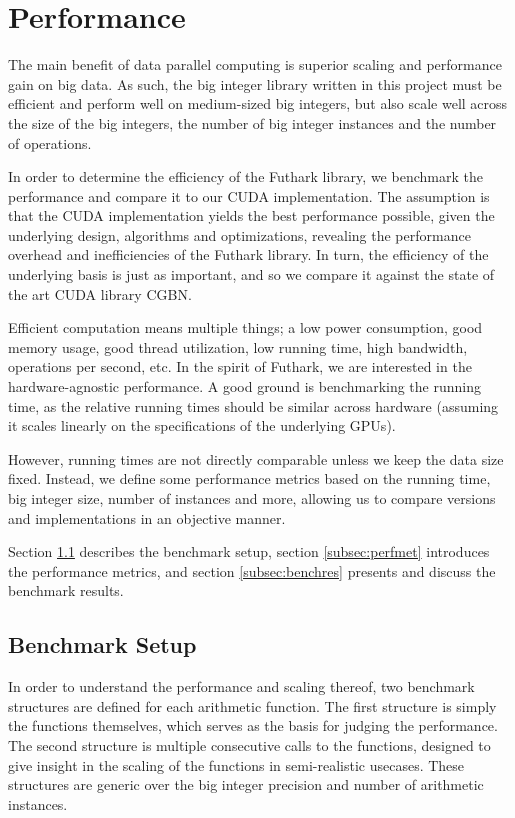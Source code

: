 \section{Performance}
\label{sec:per}

{}

The main benefit of data parallel computing is superior scaling and performance
gain on big data. As such, the big integer library written in this project must
be efficient and perform well on medium-sized big integers, but also scale well
across the size of the big integers, the number of big integer instances and the
number of operations.

In order to determine the efficiency of the Futhark library, we benchmark the
performance and compare it to our CUDA implementation. The assumption is that
the CUDA implementation yields the best performance possible, given the
underlying design, algorithms and optimizations, revealing the performance
overhead and inefficiencies of the Futhark library. In turn, the efficiency of
the underlying basis is just as important, and so we compare it against the
state of the art CUDA library CGBN.

Efficient computation means multiple things; a low power consumption, good
memory usage, good thread utilization, low running time, high bandwidth,
operations per second, etc. In the spirit of Futhark, we are interested in the
hardware-agnostic performance. A good ground is benchmarking the running time,
as the relative running times should be similar across hardware (assuming it
scales linearly on the specifications of the underlying GPUs).

However, running times are not directly comparable unless we keep the data size
fixed. Instead, we define some performance metrics based on the running time,
big integer size, number of instances and more, allowing us to compare versions
and implementations in an objective manner.

Section \ref{subsec:benchset} describes the benchmark setup, section
\ref{subsec:perfmet} introduces the performance metrics, and section
\ref{subsec:benchres} presents and discuss the benchmark results.

\subsection{Benchmark Setup}
\label{subsec:benchset}

{}

In order to understand the performance and scaling thereof, two benchmark
structures are defined for each arithmetic function. The first structure is
simply the functions themselves, which serves as the basis for judging the
performance. The second structure is multiple consecutive calls to the
functions, designed to give insight in the scaling of the functions in
semi-realistic usecases. These structures are generic over the big integer
precision and number of arithmetic instances.

